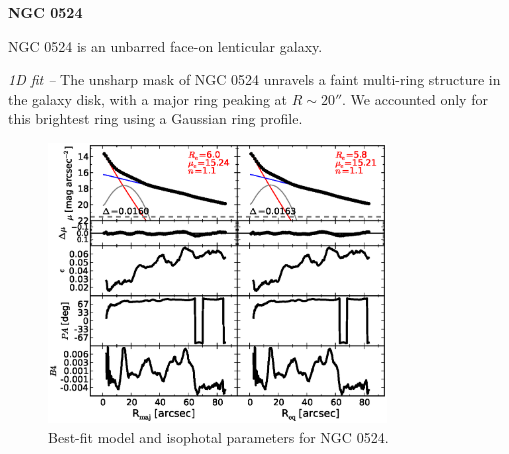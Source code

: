 \documentclass[preprint2]{emulateapj}
\newcommand{\fitfigurewidth}{0.8\textwidth}
\begin{document}
  \clearpage\newpage\noindent
  {\bf NGC 0524 \\} 

  NGC 0524 is an unbarred face-on lenticular galaxy. 

  \emph{1D fit -- }
  The unsharp mask of NGC 0524 unravels a faint multi-ring structure in the galaxy disk,
  with a major ring peaking at $R \sim 20''$.
  We accounted only for this brightest ring using a Gaussian ring profile.

  \begin{figure}[h]
  \begin{center}
  \includegraphics[width=\fitfigurewidth]{images/n0524_1Dfit.eps}
  \caption{Best-fit model and isophotal parameters for NGC 0524.}
  \end{center}
  \end{figure}
\end{document}
